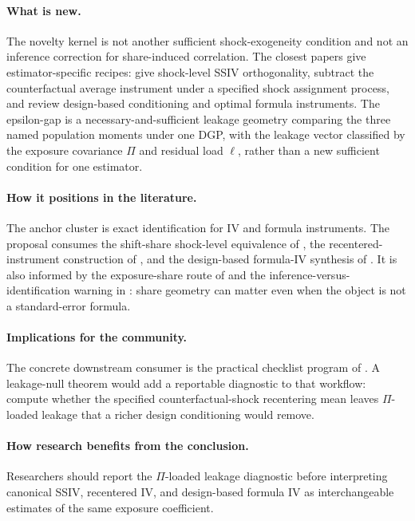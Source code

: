 \documentclass[11pt]{article}
\theoremstyle{definition}
\theoremstyle{plain}
\theoremstyle{remark}
\begin{document}
\paragraph{What is new.}
The novelty kernel is not another sufficient shock-exogeneity condition and not an inference correction for share-induced correlation.  The closest papers give estimator-specific recipes: \citet{BorusyakHullJaravel2022REStud} give shock-level SSIV orthogonality, \citet{BorusyakHull2023Econometrica} subtract the counterfactual average instrument under a specified shock assignment process, and \citet{BorusyakHullJaravel2025ECTJ} review design-based conditioning and optimal formula instruments.  The epsilon-gap is a necessary-and-sufficient leakage geometry comparing the three named population moments under one DGP, with the leakage vector classified by the exposure covariance \(\Pi\) and residual load \(\ell\), rather than a new sufficient condition for one estimator.

\paragraph{How it positions in the literature.}
The anchor cluster is exact identification for IV and formula instruments.  The proposal consumes the shift-share shock-level equivalence of \citet{BorusyakHullJaravel2022REStud}, the recentered-instrument construction of \citet{BorusyakHull2023Econometrica}, and the design-based formula-IV synthesis of \citet{BorusyakHullJaravel2025ECTJ}.  It is also informed by the exposure-share route of \citet{GoldsmithPinkhamSorkinSwift2020AER} and the inference-versus-identification warning in \citet{AdaoKolesarMorales2019QJE}: share geometry can matter even when the object is not a standard-error formula.

\paragraph{Implications for the community.}
The concrete downstream consumer is the practical checklist program of \citet{BorusyakHullJaravel2025JEP}.  A leakage-null theorem would add a reportable diagnostic to that workflow: compute whether the specified counterfactual-shock recentering mean leaves \(\Pi\)-loaded leakage that a richer design conditioning would remove.

\paragraph{How research benefits from the conclusion.}
Researchers should report the \(\Pi\)-loaded leakage diagnostic before interpreting canonical SSIV, recentered IV, and design-based formula IV as interchangeable estimates of the same exposure coefficient.
\end{document}

